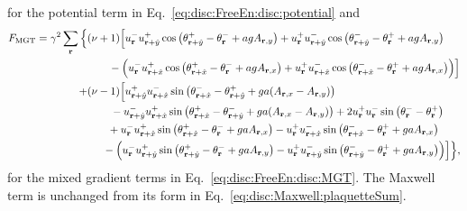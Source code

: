 for the potential term in Eq.~\eqref{eq:disc:FreeEn:disc:potential} and
\begin{equation}
  \begin{split}
	F_\text{MGT} = \gamma^2\sum_\v{r}\Big\{&(\nu+1)\Big[u^-_\v{r}u^+_{\v{r}+\hat{y}}\cos\big(\theta^+_{\v{r}+\hat{y}} - \theta^-_\v{r} + agA_{\v{r},y}\big)
+ u^+_\v{r}u^-_{\v{r}+\hat{y}}\cos\big(\theta^-_{\v{r} + \hat{y}} - \theta^+_\v{r} + agA_{\v{r},y}\big)\\
&\phantom{(\nu+}\;-\Big( u^-_\v{r}u^+_{\v{r}+\hat{x}}\cos\big(\theta^+_{\v{r}+\hat{x}} - \theta^-_\v{r} + agA_{\v{r},x}\big)
+ u^+_\v{r}u^-_{\v{r}+\hat{x}}\cos\big(\theta^-_{\v{r} + \hat{x}} - \theta^+_\v{r} + agA_{\v{r},x}\big)\Big)\Big]\\
+&(\nu-1)\Big[u^+_{\v{r}+\hat{y}}u^-_{\v{r}+\hat{x}}\sin\big(\theta^-_{\v{r}+\hat{x}} - \theta^+_{\v{r}+\hat{y}} + ga(A_{\v{r},x} - A_{\v{r},y})\big)\\
  &\phantom{(\nu+}\;\,-u^-_{\v{r}+\hat{y}}u^+_{\v{r}+\hat{x}}\sin\big(\theta^+_{\v{r}+\hat{x}} - \theta^-_{\v{r}+\hat{y}} + ga(A_{\v{r},x} - A_{\v{r},y})\big) + 2u^+_\v{r}u^-_\v{r}\sin\big(\theta^-_\v{r}-\theta^+_\v{r}\big)\\
  &\phantom{(\nu0}\;\,+u^-_\v{r}u^+_{\v{r}+\hat{x}}\sin\big(\theta^+_{\v{r}+\hat{x}} - \theta^-_\v{r}+gaA_{\v{r},x}\big)
  -u^+_\v{r}u^-_{\v{r}+\hat{x}}\sin\big(\theta^-_{\v{r}+\hat{x}} - \theta^+_\v{r}+gaA_{\v{r},x}\big)\\
  &\phantom{(\nu0}-\Big(u^-_\v{r}u^+_{\v{r}+\hat{y}}\sin\big(\theta^+_{\v{r}+\hat{y}} - \theta^-_\v{r}+gaA_{\v{r},y}\big)
-u^+_\v{r}u^-_{\v{r}+\hat{y}}\sin\big(\theta^-_{\v{r}+\hat{y}} - \theta^+_\v{r}+gaA_{\v{r},y}\big)\Big)\Big]\Big\},
  \end{split}
  \label{eq:disc:cp1:MGT}
\end{equation}
for the mixed gradient terms in Eq.~\eqref{eq:disc:FreeEn:disc:MGT}. The Maxwell term is unchanged from its form in Eq.~\eqref{eq:disc:Maxwell:plaquetteSum}.
